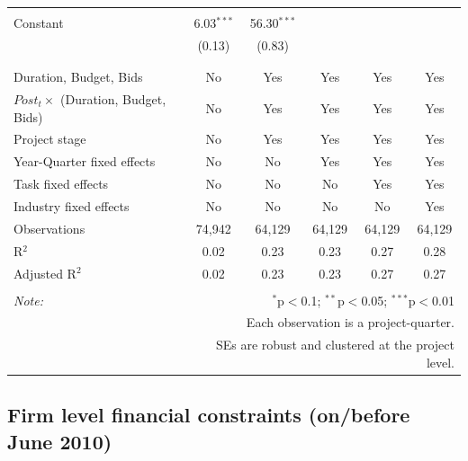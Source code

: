 \documentclass[
]{article}
\begin{document}
\begin{table}[H]
\begin{tabular}{@{\extracolsep{-2pt}}lccccc}
  & & & & & \\ 
 Constant & 6.03$^{***}$ & 56.30$^{***}$ &  &  &  \\ 
  & (0.13) & (0.83) &  &  &  \\ 
  & & & & & \\ 
\hline \\[-1.8ex] 
Duration, Budget, Bids & No & Yes & Yes & Yes & Yes \\ 
$Post_t \times $  (Duration, Budget, Bids) & No & Yes & Yes & Yes & Yes \\ 
Project stage & No & Yes & Yes & Yes & Yes \\ 
Year-Quarter fixed effects & No & No & Yes & Yes & Yes \\ 
Task fixed effects & No & No & No & Yes & Yes \\ 
Industry fixed effects & No & No & No & No & Yes \\ 
Observations & 74,942 & 64,129 & 64,129 & 64,129 & 64,129 \\ 
R$^{2}$ & 0.02 & 0.23 & 0.23 & 0.27 & 0.28 \\ 
Adjusted R$^{2}$ & 0.02 & 0.23 & 0.23 & 0.27 & 0.27 \\ 
\hline 
\hline \\[-1.8ex] 
\textit{Note:}  & \multicolumn{5}{r}{$^{*}$p$<$0.1; $^{**}$p$<$0.05; $^{***}$p$<$0.01} \\ 
 & \multicolumn{5}{r}{Each observation is a project-quarter.} \\ 
 & \multicolumn{5}{r}{SEs are robust and clustered at the project level.} \\ 
\end{tabular} 
\end{table}

\hypertarget{firm-level-financial-constraints-onbefore-june-2010-1}{%
\subsection{Firm level financial constraints (on/before June
2010)}\label{firm-level-financial-constraints-onbefore-june-2010-1}}
\end{document}
